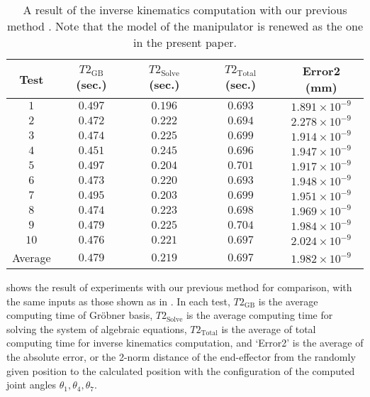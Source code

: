 \documentclass{birkjour}
\theoremstyle{plain}
\theoremstyle{definition}
\begin{document}
    \begin{table}[t]
        \caption{A result of the inverse kinematics computation with our previous
        method \cite{hor-ter-mik2020}. Note that the model of the manipulator is renewed 
        as the one in the present paper.}
        \label{table:previous}
        \begin{center}
            \begin{tabular}{ccccc} 
                \hline
                Test & $T2_\textrm{GB}$ (sec.) & $T2_\textrm{Solve}$ (sec.) &
                 $T2_\textrm{Total}$ (sec.) & Error2 (mm) \\ 
                \hline
                $1$ & $0.497$ & $0.196$ & $0.693$ & $1.891{\times}10^{-9}$ \\
                $2$ & $0.472$ & $0.222$ & $0.694$ & $2.278{\times}10^{-9}$ \\
                $3$ & $0.474$ & $0.225$ & $0.699$ & $1.914{\times}10^{-9}$ \\
                $4$ & $0.451$ & $0.245$ & $0.696$ & $1.947{\times}10^{-9}$ \\
                $5$ & $0.497$ & $0.204$ & $0.701$ & $1.917{\times}10^{-9}$ \\
                $6$ & $0.473$ & $0.220$ & $0.693$ & $1.948{\times}10^{-9}$ \\
                $7$ & $0.495$ & $0.203$ & $0.699$ & $1.951{\times}10^{-9}$ \\
                $8$ & $0.474$ & $0.223$ & $0.698$ & $1.969{\times}10^{-9}$ \\
                $9$ & $0.479$ & $0.225$ & $0.704$ & $1.984{\times}10^{-9}$ \\
                $10$ & $0.476$ & $0.221$ & $0.697$ & $2.024{\times}10^{-9}$ \\
                \hline
                Average & $0.479$ & $0.219$ & $0.697$ & $1.982{\times}10^{-9}$ \\ 
                \hline
            \end{tabular}
        \end{center}
    \end{table}
     shows the result of experiments with our previous method
    for comparison, with the same inputs as those shown as in . 
    In each test, $T2_\textrm{GB}$ is the average computing time of
    Gr\"obner basis, $T2_\textrm{Solve}$ is the average computing time for
    solving the system of algebraic equations, 
    $T2_\textrm{Total}$ is the average of total computing time for inverse 
    kinematics computation,
    and `Error2' is the average of the absolute error, 
    or the 2-norm distance of the end-effector from the randomly given position 
    to the calculated position with the configuration 
    of the computed joint angles $\theta_1,\theta_4,\theta_7$.
\end{document}
